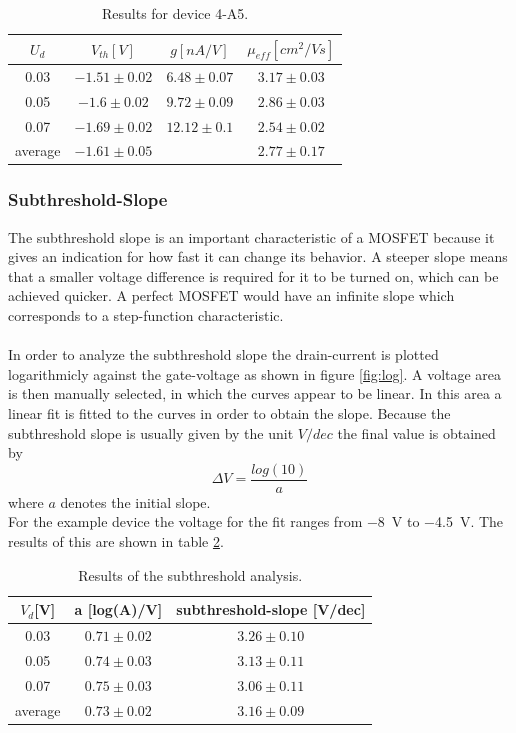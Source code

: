\documentclass[%
 reprint,
amsmath,amssymb,
pra,
]{revtex4-1}
\begin{document}
\begin{table}[b]
\centering
\begin{tabular}{|c|c|c|c|}
\hline
$U_d$ & $V_{th}[\si{V}]$ & $g[\si{nA/V}]$ & $\mu_{eff}[\si{cm^2/Vs}]$\\
\hline
0.03 & $-1.51\pm 0.02$ & $6.48\pm 0.07$ & $3.17\pm 0.03$\\
\hline
0.05 & $-1.6\pm 0.02$ & $9.72\pm 0.09$ & $2.86\pm 0.03$\\
\hline
0.07 & $-1.69\pm 0.02$ & $12.12\pm 0.1$ & $2.54\pm 0.02$\\
\hline
average & $-1.61\pm 0.05$ & &  $2.77\pm 0.17$\\
\hline
\end{tabular}
\caption{Results for device 4-A5.}
\label{tab:exaple_data}
\end{table}





\subsubsection{Subthreshold-Slope}

The subthreshold slope is an important characteristic of a MOSFET because it gives an indication for how fast it can change its behavior. A steeper slope means that a smaller voltage difference is required for it to be turned on, which can be achieved quicker. A perfect MOSFET would have an infinite slope which corresponds to a step-function characteristic.\\
\\
In order to analyze the subthreshold slope the drain-current is plotted logarithmicly against the gate-voltage as shown in figure \ref{fig:log}. A voltage area is then manually  selected, in which the curves appear to be linear. In this area a linear fit is fitted to the curves in order to obtain the slope. Because the subthreshold slope is usually given by the unit $\si{V/dec}$ the final value is obtained by
\begin{equation}
\Delta V = \dfrac{\si{log}(10)}{a}
\end{equation}
where $a$ denotes the initial slope.\\
For the example device the voltage for the fit ranges from \SI{-8}{V} to \SI{-4.5}{V}. The results of this are shown in table \ref{tab:subthreshold_example}.

\begin{table}[h]
\centering
\begin{tabular}{|c|c|c|}
\hline
$V_d$[\si{V}] & a [log(A)/V] & subthreshold-slope [V/dec] \\
\hline
0.03 & $0.71\pm 0.02$ & $3.26\pm 0.10$\\
\hline
0.05 & $0.74\pm 0.03$ & $3.13\pm 0.11$\\
\hline
0.07 & $0.75\pm 0.03$ & $3.06\pm 0.11$\\
\hline
average & $0.73\pm 0.02$ & $3.16\pm 0.09$\\
\hline
\end{tabular}
\caption{Results of the subthreshold analysis.}
\label{tab:subthreshold_example}
\end{table}
\end{document}
